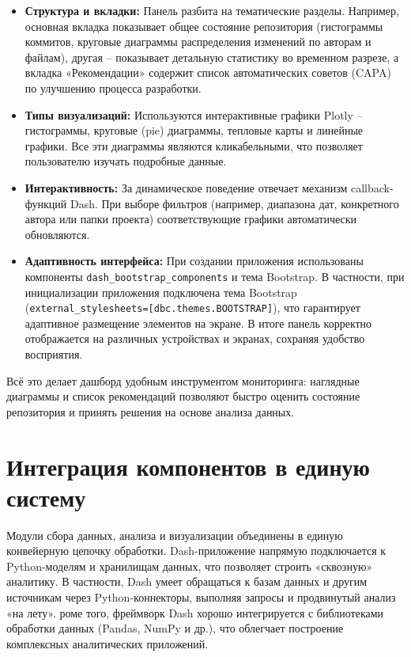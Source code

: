 \begin{itemize} 
	\item \textbf{Структура и вкладки:} Панель разбита на тематические разделы. Например, основная вкладка показывает общее состояние репозитория (гистограммы коммитов, круговые диаграммы распределения изменений по авторам и файлам), другая – показывает детальную статистику во временном разрезе, а вкладка «Рекомендации» содержит список автоматических советов (CAPA) по улучшению процесса разработки. 
	\item \textbf{Типы визуализаций:} Используются интерактивные графики Plotly – гистограммы, круговые (pie) диаграммы, тепловые карты и линейные графики. Все эти диаграммы являются кликабельными, что позволяет пользователю изучать подробные данные.
	\item \textbf{Интерактивность:} За динамическое поведение отвечает механизм callback-функций Dash. При выборе фильтров (например, диапазона дат, конкретного автора или папки проекта) соответствующие графики автоматически обновляются.
	\item \textbf{Адаптивность интерфейса:} При создании приложения использованы компоненты \verb |dash_bootstrap_components| и тема Bootstrap. В частности, при инициализации приложения подключена тема Bootstrap (\verb|external_stylesheets=[dbc.themes.BOOTSTRAP]|), что гарантирует адаптивное размещение элементов на экране. В итоге панель корректно отображается на различных устройствах и экранах, сохраняя удобство восприятия.
	
\end{itemize}

Всё это делает дашборд удобным инструментом мониторинга: наглядные диаграммы и список рекомендаций позволяют быстро оценить состояние репозитория и принять решения на основе анализа данных.

\section{Интеграция компонентов в единую систему} \label{ch3:sec5}

Модули сбора данных, анализа и визуализации объединены в единую конвейерную цепочку обработки. Dash-приложение напрямую подключается к Python-моделям и хранилищам данных, что позволяет строить «сквозную» аналитику. В частности, Dash умеет обращаться к базам данных и другим источникам через Python-коннекторы, выполняя запросы и продвинутый анализ «на лету». роме того, фреймворк Dash хорошо интегрируется с библиотеками обработки данных (Pandas, NumPy и др.), что облегчает построение комплексных аналитических приложений.


